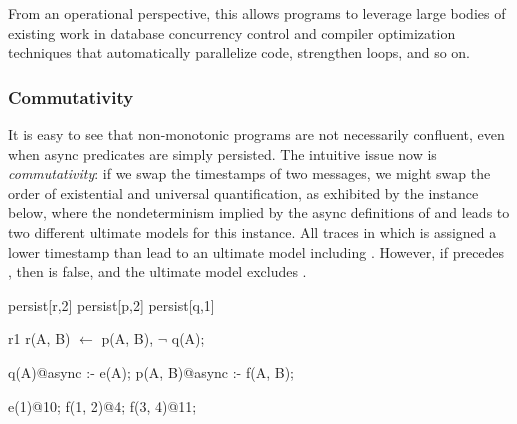 From an operational perspective, this allows \lang programs to
leverage large bodies of existing work in database concurrency control
and compiler optimization techniques that automatically parallelize
code, strengthen loops, and so on.  




\subsubsection{Commutativity}

It is easy to see that non-monotonic programs are not necessarily confluent,
even when async predicates are simply persisted.  The intuitive issue now is
{\em commutativity}: if we swap the timestamps of two messages, we might swap
the order of existential and universal quantification, as exhibited by the
instance below, where the 
nondeterminism implied by the async definitions of  and 
leads to two different ultimate models for this instance.  All traces in which
 is assigned a lower timestamp than  lead to an ultimate
model including .  However, if  precedes
, then  is false, and the ultimate model
excludes .

\begin{Dedalus}
persist[r,2]
persist[p,2]
persist[q,1]

r1
r(A, B) \(\leftarrow\) 
    p(A, B), \(\lnot\) q(A);

q(A)@async :- e(A);
p(A, B)@async :- f(A, B);

e(1)@10;
f(1, 2)@4;
f(3, 4)@11; 
\end{Dedalus} 

